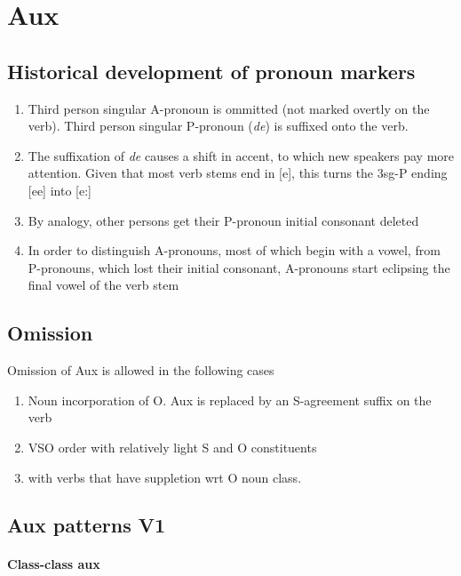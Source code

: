 \documentclass[8pt]{book}
\begin{document}
\section{Aux}

\subsection{Historical development of pronoun markers}
\begin{enumerate}
	\item Third person singular A-pronoun is ommitted (not marked overtly on the verb). Third person singular P-pronoun (\textit{de}) is suffixed onto the verb.
	\item The suffixation of \textit{de} causes a shift in accent, to which new speakers pay more attention. Given that most verb stems end in [e], this turns the 3sg-P ending [ee] into [e:]
	\item By analogy, other persons get their P-pronoun initial consonant deleted
	\item In order to distinguish A-pronouns, most of which begin with a vowel, from P-pronouns, which lost their initial consonant, A-pronouns start eclipsing the final vowel of the verb stem
\end{enumerate}

\subsection{Omission}
Omission of Aux is allowed in the following cases
\begin{enumerate}
	\item Noun incorporation of O. Aux is replaced by an S-agreement suffix on the verb
	\item VSO order with relatively light S and O constituents
	\item with verbs that have suppletion wrt O noun class.
\end{enumerate}

\subsection{Aux patterns V1}
\paragraph{Class-class aux}
\end{document}
